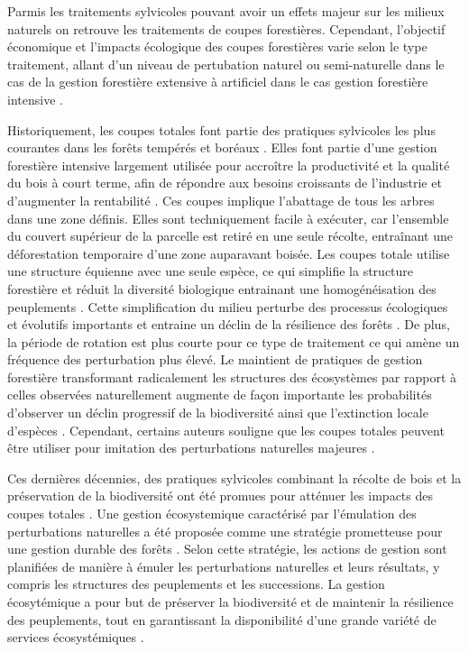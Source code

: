 Parmis les traitements sylvicoles pouvant avoir un effets majeur sur les milieux naturels on retrouve les traitements de coupes forestières.
Cependant, l'objectif économique et l'impacts écologique des coupes forestières varie selon le type traitement, allant d'un niveau de pertubation naturel ou semi-naturelle dans le cas de la gestion forestière extensive à artificiel dans le cas gestion forestière intensive \citep{Ameray2021Forestcarbon}. 

Historiquement, les coupes totales font partie des pratiques sylvicoles les plus courantes dans les forêts tempérés et boréaux \citep{Fedrowitz2014Canretention,Chaudhary2016Impactforest}. 
Elles font partie d'une gestion forestière intensive largement utilisée pour accroître la productivité et la qualité du bois à court terme, afin de répondre aux besoins croissants de l'industrie et d'augmenter la rentabilité \citep{Irland2011TimberProductivitya}.
Ces coupes implique l'abattage de tous les arbres dans une zone définis.
Elles sont techniquement facile à exécuter, car l'ensemble du couvert supérieur de la parcelle est retiré en une seule récolte, entraînant une déforestation temporaire d'une zone auparavant boisée. 
Les coupes totale utilise une structure équienne avec une seule espèce, ce qui simplifie la structure forestière et réduit la diversité biologique entrainant une homogénéisation des peuplements \citep{Rosenvald2008whatwhen}. 
Cette simplification du milieu perturbe des processus écologiques et évolutifs importants et entraine un déclin de la résilience des forêts \citep{Holling2001UnderstandingComplexity}. 
De plus, la période de rotation est plus courte pour ce type de traitement ce qui amène un fréquence des perturbation plus élevé. 
Le maintient de pratiques de gestion forestière transformant radicalement les structures des écosystèmes par rapport à celles observées naturellement augmente de façon importante les probabilités d'observer un déclin progressif de la biodiversité ainsi que l'extinction locale d'espèces \citep{Hanski2000Extinctiondebt}.  
Cependant, certains auteurs souligne que les coupes totales peuvent être utiliser pour imitation des perturbations naturelles majeures \citep{Greenberg1995comparisonbird}. 

Ces dernières décennies, des pratiques sylvicoles combinant la récolte de bois et la préservation de la biodiversité ont été promues pour atténuer les impacts des coupes totales \citep{Gustafsson2012Retentionforestry}.
Une gestion écosystemique caractérisé par l'émulation des perturbations naturelles a été proposée comme une stratégie prometteuse pour une gestion durable des forêts \citep{Perry1998scientificbasis,Kuuluvainen2002Naturalvariabilitya}. 
Selon cette stratégie, les actions de gestion sont planifiées de manière à émuler les perturbations naturelles et leurs résultats, y compris les structures des peuplements et les successions. 
La gestion écosytémique a pour but de préserver la biodiversité et de maintenir la résilience des peuplements, tout en garantissant la disponibilité d'une grande variété de services écosystémiques \citep{Szaro1998emergenceecosystem,MacDicken2015Globalprogress}.

